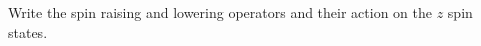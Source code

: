 

\vspace*{\fill}
\centering

Write the spin raising and lowering operators and their action on the $z$ spin states.

\centering
\vspace*{\fill}

